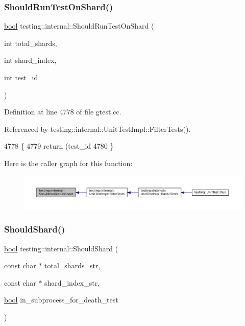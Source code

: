 \subsubsection{\texorpdfstring{Should\+Run\+Test\+On\+Shard()}{ShouldRunTestOnShard()}}
{\footnotesize\ttfamily \hyperlink{classbool}{bool} testing\+::internal\+::\+Should\+Run\+Test\+On\+Shard (\begin{DoxyParamCaption}\item[{int}]{total\+\_\+shards,  }\item[{int}]{shard\+\_\+index,  }\item[{int}]{test\+\_\+id }\end{DoxyParamCaption})}



Definition at line 4778 of file gtest.\+cc.



Referenced by testing\+::internal\+::\+Unit\+Test\+Impl\+::\+Filter\+Tests().


\begin{DoxyCode}
4778                                                                           \{
4779   \textcolor{keywordflow}{return} (test\_id %
4780 \}
\end{DoxyCode}
Here is the caller graph for this function\+:
\nopagebreak
\begin{figure}[H]
\begin{center}
\leavevmode
\includegraphics[width=350pt]{namespacetesting_1_1internal_a437bd89f5bc532778d7467600e210395_icgraph}
\end{center}
\end{figure}
\mbox{\label{namespacetesting_1_1internal_a0fe41657b1d1ab7ec4e37ec07403ee6c}} 
\subsubsection{\texorpdfstring{Should\+Shard()}{ShouldShard()}}
{\footnotesize\ttfamily \hyperlink{classbool}{bool} testing\+::internal\+::\+Should\+Shard (\begin{DoxyParamCaption}\item[{const char $\ast$}]{total\+\_\+shards\+\_\+str,  }\item[{const char $\ast$}]{shard\+\_\+index\+\_\+str,  }\item[{\hyperlink{classbool}{bool}}]{in\+\_\+subprocess\+\_\+for\+\_\+death\+\_\+test }\end{DoxyParamCaption})}



